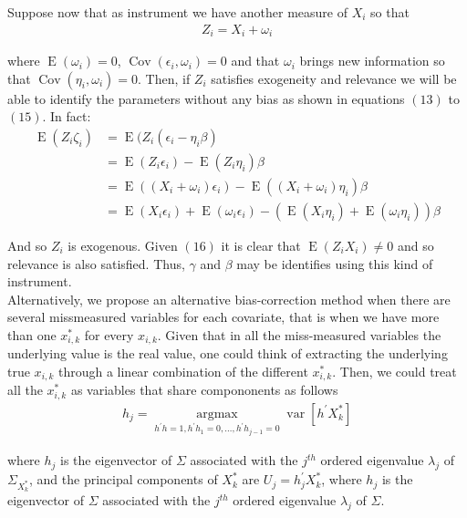 \documentclass[10pt]{article}
\def\b{\beta}
\begin{document}
        Suppose now that as instrument we have another measure of $X_i$ so that
        \begin{align}
            Z_i=X_i+\omega_i
        \end{align}
        
        where $\operatorname{E}(\omega_i)=0$, $\operatorname{Cov}(\epsilon_i,\omega_i)=0$ and that $\omega_i$ brings new information so that $\operatorname{Cov}(\eta_i,\omega_i)=0$. Then, if $Z_i$ satisfies exogeneity and relevance we will be able to identify the parameters without any bias as shown in equations $(13)$ to $(15)$. In fact:
        \begin{align}
            \operatorname{E}(Z_i\zeta_i)&=\operatorname{E}(Z_i(\epsilon_i-\eta_i\b)\\
            &=\operatorname{E}(Z_i\epsilon_i)-\operatorname{E}(Z_i\eta_i)\b\\
           &= \operatorname{E}((X_i+\omega_i)\epsilon_i)-\operatorname{E}((X_i+\omega_i)\eta_i)\b \\
           &=\operatorname{E}(X_i\epsilon_i) + \operatorname{E}(\omega_i\epsilon_i)-(\operatorname{E}(X_i\eta_i)+\operatorname{E}(\omega_i\eta_i))\b
        \end{align}
        
        And so $Z_i$ is exogenous. Given $(16)$ it is clear that $\operatorname{E}(Z_iX_i)\neq0$ and so relevance is also satisfied. Thus, $\gamma$ and $\b$ may be identifies using this kind of instrument.\\
        
        Alternatively, we propose an alternative bias-correction method when there are several missmeasured variables for each covariate, that is when we have more than one $x_{i,k}^*$ for every $x_{i,k}$. Given that in all the miss-measured variables the underlying value is the real value, one could think of extracting the underlying true $x_{i,k}$ through a linear combination of the different $x_{i,k}^*$. Then, we could treat all the $x_{i,k}^*$ as variables that share compononents as follows
        \begin{align}
           h_{j}=\underset{h^{\prime} h=1, h^{\prime} h_{1}=0, \ldots, h^{\prime} h_{j-1}=0}{\operatorname{argmax}} \operatorname{var}\left[h^{\prime} X^*_k\right]  
        \end{align}
        
        
        where $h_j$ is the eigenvector of $\Sigma$ associated with the $j^{t h}$ ordered eigenvalue $\lambda_{j}$ of $\Sigma_{X^*_k}$, and the principal components of $X^*_k$ are $U_{j}=h_{j}^{\prime} X^*_k$, where $h_{j}$ is the eigenvector of $\Sigma$ associated with the $j^{t h}$ ordered eigenvalue $\lambda_{j}$ of $\Sigma$.\\
        
\end{document}
